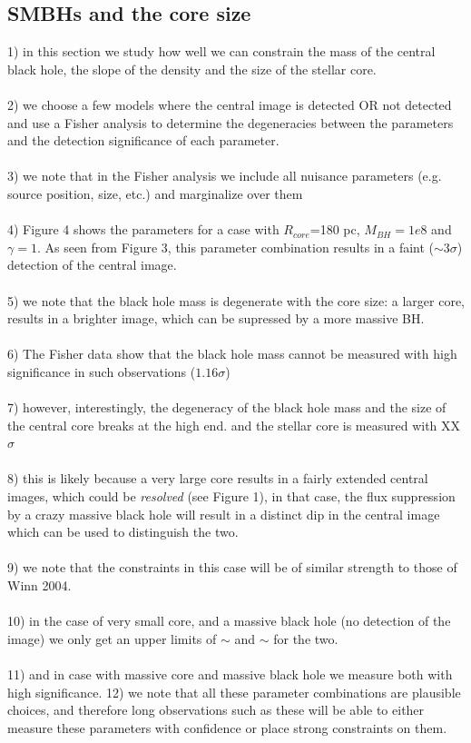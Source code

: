 \documentclass[chicago]{emulateapj}
\begin{document}
\begin{framed}
\subsection{SMBHs and the core size}
1) in this section we study how well we can constrain the mass of the central black hole, the slope of the density and the size of the stellar core. \\ \\
2) we choose a few models where the central image is detected OR not detected and use a Fisher analysis to determine the degeneracies between the parameters and the detection significance of each parameter.  \\ \\
3) we note that in the Fisher analysis we include all nuisance parameters (e.g. source position, size, etc.) and marginalize over them  \\ \\
4) Figure 4 shows the parameters for a case with $R_{core}$=180 pc, $M_{BH}=1e8$ and $\gamma=1$. As seen from Figure 3,  this parameter combination results in a faint ($\sim3\sigma$) detection of the central image. \\ \\
5) we note that the black hole mass is degenerate with the core size: a larger core, results in a brighter image, which can be supressed by a more massive BH. \\ \\
6) The Fisher data show that the black hole mass cannot be measured with high significance in such observations ($1.16\sigma$) \\ \\
7) however, interestingly, the degeneracy of the black hole mass and the size of the central core breaks at the high end. and the stellar core is measured with XX $\sigma$\\ \\
8) this is likely because a very large core results in a fairly extended central images, which could be \emph{resolved} (see Figure 1), in that case, the flux suppression by a crazy massive black hole will result in a distinct dip in the central image  which can be used to distinguish the two. \\ \\
9) we note that the constraints in this case will be of similar strength to those of Winn 2004. \\ \\ 
10) in the case of very small core, and a massive black hole (no detection of the image) we only get an upper limits of $\sim$ and $\sim$ for the two. \\ \\
11) and in case with massive core and massive black hole we measure both with high significance. 
12) we note that all these parameter combinations are plausible choices, and therefore long observations such as these will be able to either measure these parameters with confidence or place strong constraints on them.


\end{framed}
\end{document}

